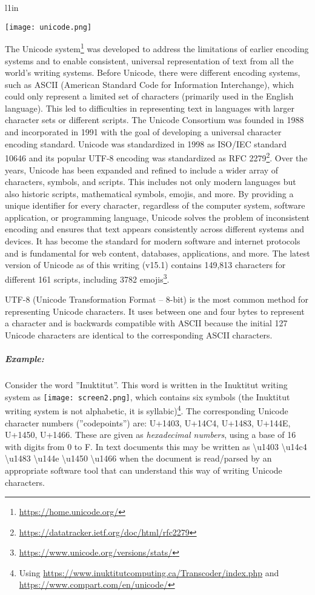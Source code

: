\begin{wrapfigure}{l}{1in}
\begin{center}
\texttt{[image: unicode.png]}
\end{center}
\end{wrapfigure}

The Unicode system\footnote{\url{https://home.unicode.org/}} was developed to address the limitations of earlier encoding systems and to enable consistent, universal representation of text from all the world's writing systems. Before Unicode, there were different encoding systems, such as ASCII (American Standard Code for Information Interchange), which could only represent a limited set of characters (primarily used in the English language). This led to difficulties in representing text in languages with larger character sets or different scripts. The Unicode Consortium was founded in 1988 and incorporated in 1991 with the goal of developing a universal character encoding standard. Unicode was standardized in 1998 as ISO/IEC standard 10646 and its popular UTF-8 encoding was standardized as RFC 2279\footnote{\url{https://datatracker.ietf.org/doc/html/rfc2279}}. Over the years, Unicode has been expanded and refined to include a wider array of characters, symbols, and scripts. This includes not only modern languages but also historic scripts, mathematical symbols, emojis, and more. By providing a unique identifier for every character, regardless of the computer system, software application, or programming language, Unicode solves the problem of inconsistent encoding and ensures that text appears consistently across different systems and devices. It has become the standard for modern software and internet protocols and  is fundamental for web content, databases, applications, and more. The latest version of Unicode as of this writing (v15.1) contains 149,813 characters for different 161 scripts, including 3782 emojis\footnote{\url{https://www.unicode.org/versions/stats/}}. 

UTF-8 (Unicode Transformation Format -- 8-bit) is the most common method for representing Unicode characters. It uses between one and four bytes to represent a character and is backwards compatible with ASCII because the initial 127 Unicode characters are identical to the corresponding ASCII characters. 

\subparagraph*{Example:} Consider the word ''Inuktitut''. This word is written in the Inuktitut writing system as \texttt{[image: screen2.png]}, which contains six symbols (the Inuktitut writing system is not alphabetic, it is syllabic)\footnote{Using \url{https://www.inuktitutcomputing.ca/Transcoder/index.php} and \url{https://www.compart.com/en/unicode/}}. The corresponding Unicode character numbers (''codepoints'') are: U+1403, U+14C4, U+1483, U+144E, U+1450, U+1466. These are given as \emph{hexadecimal numbers}, using a base of 16 with digits from 0 to F. In text documents this may be written as \textbackslash u1403 \textbackslash u14c4 \textbackslash u1483 \textbackslash u144e \textbackslash u1450 \textbackslash u1466 when the document is read/parsed by an appropriate software tool that can understand this way of writing Unicode characters. 

